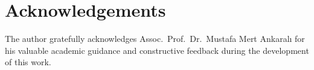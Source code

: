 \section*{Acknowledgements}
The author gratefully acknowledges Assoc.\ Prof.\ Dr.\ Mustafa Mert Ankaral\i{}
for his valuable academic guidance and constructive feedback during the
development of this work.
